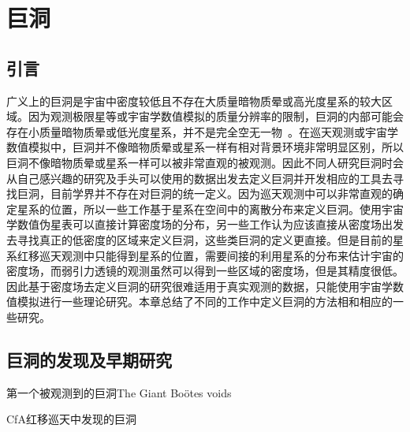\chapter{巨洞}
\label{cha:void}

\section{引言}
广义上的巨洞是宇宙中密度较低且不存在大质量暗物质晕或高光度星系的较大区域。因为观测极限星等或宇宙学数值模拟的质量分辨率的限制，巨洞的内部可能会存在小质量暗物质晕或低光度星系，并不是完全空无一物~\cite{Patiri2006372}。在巡天观测或宇宙学数值模拟中，巨洞并不像暗物质晕或星系一样有相对背景环境非常明显区别，所以巨洞不像暗物质晕或星系一样可以被非常直观的被观测。因此不同人研究巨洞时会从自己感兴趣的研究及手头可以使用的数据出发去定义巨洞并开发相应的工具去寻找巨洞，目前学界并不存在对巨洞的统一定义。因为巡天观测中可以非常直观的确定星系的位置，所以一些工作基于星系在空间中的离散分布来定义巨洞。使用宇宙学数值伪星表可以直接计算密度场的分布，另一些工作认为应该直接从密度场出发去寻找真正的低密度的区域来定义巨洞，这些类巨洞的定义更直接。但是目前的星系红移巡天观测中只能得到星系的位置，需要间接的利用星系的分布来估计宇宙的密度场，而弱引力透镜的观测虽然可以得到一些区域的密度场，但是其精度很低。因此基于密度场去定义巨洞的研究很难适用于真实观测的数据，只能使用宇宙学数值模拟进行一些理论研究。本章总结了不同的工作中定义巨洞的方法相和相应的一些研究。

\section{巨洞的发现及早期研究}
第一个被观测到的巨洞The Giant Bo\"otes voids

CfA红移巡天中发现的巨洞

